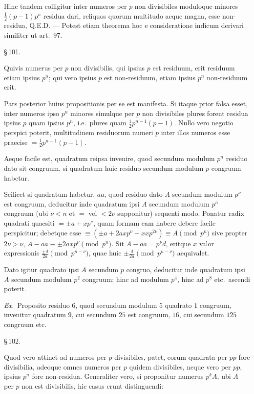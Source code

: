\documentclass[12pt,a4paper]{article}
\theoremstyle{plain}
\theoremstyle{definition}
\theoremstyle{remark}
\begin{document}
Hinc tandem colligitur inter numeros per $p$ non divisibiles moduloque minores $\frac{1}{2}(p-1)p^n$ residua dari, reliquos quorum multitudo aeque magna, esse non-residua, Q.E.D. --- Potest etiam theorema hoc e consideratione indicum derivari similiter ut art.~97.

\begin{center}\S\,101.\end{center}

Quivis numerus per $p$ non divisibilis, qui ipsius $p$ est residuum, erit residuum etiam ipsius $p^n$; qui vero ipsius $p$ est non-residuum, etiam ipsius $p^n$ non-residuum erit.

Pars posterior huius propositionis per se est manifesta. Si itaque prior falsa esset, inter numeros ipso $p^n$ minores simulque per $p$ non divisibiles plures forent residua ipsius $p$ quam ipsius $p^n$, i.e.\ plures quam $\frac{1}{2}p^{n-1}(p-1)$. Nullo vero negotio perspici poterit, multitudinem residuorum numeri $p$ inter illos numeros esse praecise $= \frac{1}{2}p^{n-1}(p-1)$.

Aeque facile est, quadratum reipsa invenire, quod secundum modulum $p^n$ residuo dato sit congruum, si quadratum huic residuo secundum modulum $p$ congruum habetur.

Scilicet si quadratum habetur, $aa$, quod residuo dato $A$ secundum modulum $p^\nu$ est congruum, deducitur inde quadratum ipsi $A$ secundum modulum $p^n$ congruum (ubi $\nu < n$ et $=$ vel $< 2\nu$ supponitur) sequenti modo. Ponatur radix quadrati quaesiti $= \pm a + xp^\nu$, quam formam eam habere debere facile perspicitur; debetque esse $\equiv (\pm a + 2axp^\nu + xx p^{2\nu}) \equiv A \pmod{p^n}$ sive propter $2\nu > \nu$, $A - aa \equiv \pm 2axp^\nu \pmod{p^n}$. Sit $A - aa = p^\nu d$, eritque $x$ valor expressionis $\frac{\pm d}{2a} \pmod{p^{n-\nu}}$, quae huic $\pm \frac{d}{2a} \pmod{p^{n-\nu}}$ aequivalet.

Dato igitur quadrato ipsi $A$ secundum $p$ congruo, deducitur inde quadratum ipsi $A$ secundum modulum $p^2$ congruum; hinc ad modulum $p^4$, hinc ad $p^8$ etc.\ ascendi poterit.

\textit{Ex.}\ Proposito residuo $6$, quod secundum modulum $5$ quadrato $1$ congruum, invenitur quadratum $9$, cui secundum $25$ est congruum, $16$, cui secundum $125$ congruum etc.

\begin{center}\S\,102.\end{center}

Quod vero attinet ad numeros per $p$ divisibiles, patet, eorum quadrata per $pp$ fore divisibilia, adeoque omnes numeros per $p$ quidem divisibiles, neque vero per $pp$, ipsius $p^n$ fore non-residua. Generaliter vero, si proponitur numerus $p^k A$, ubi $A$ per $p$ non est divisibilis, hic casus erunt distinguendi:
\end{document}
